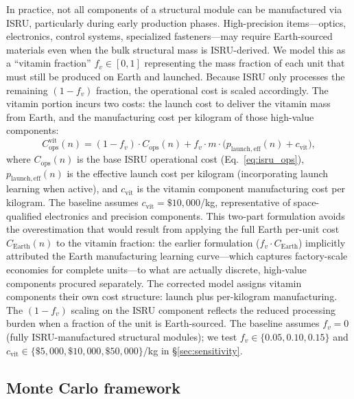 \documentclass[preprint,12pt]{elsarticle}
\begin{document}
In practice, not all components of a structural module can be manufactured via ISRU, particularly during early production phases. High-precision items---optics, electronics, control systems, specialized fasteners---may require Earth-sourced materials even when the bulk structural mass is ISRU-derived. We model this as a ``vitamin fraction'' $f_v \in [0, 1]$ representing the mass fraction of each unit that must still be produced on Earth and launched. Because ISRU only processes the remaining $(1 - f_v)$ fraction, the operational cost is scaled accordingly. The vitamin portion incurs two costs: the launch cost to deliver the vitamin mass from Earth, and the manufacturing cost per kilogram of those high-value components:
\begin{equation}
  C_{\mathrm{ops}}^{\mathrm{vit}}(n) = (1 - f_v) \cdot C_{\mathrm{ops}}(n) + f_v \cdot m \cdot \bigl(p_{\mathrm{launch,eff}}(n) + c_{\mathrm{vit}}\bigr),
  \label{eq:vitamin}
\end{equation}
where $C_{\mathrm{ops}}(n)$ is the base ISRU operational cost (Eq.~\ref{eq:isru_ops}), $p_{\mathrm{launch,eff}}(n)$ is the effective launch cost per kilogram (incorporating launch learning when active), and $c_{\mathrm{vit}}$ is the vitamin component manufacturing cost per kilogram. The baseline assumes $c_{\mathrm{vit}} = \$10{,}000$/kg, representative of space-qualified electronics and precision components. This two-part formulation avoids the overestimation that would result from applying the full Earth per-unit cost $C_{\mathrm{Earth}}(n)$ to the vitamin fraction: the earlier formulation ($f_v \cdot C_{\mathrm{Earth}}$) implicitly attributed the Earth manufacturing learning curve---which captures factory-scale economies for complete units---to what are actually discrete, high-value components procured separately. The corrected model assigns vitamin components their own cost structure: launch plus per-kilogram manufacturing. The $(1 - f_v)$ scaling on the ISRU component reflects the reduced processing burden when a fraction of the unit is Earth-sourced. The baseline assumes $f_v = 0$ (fully ISRU-manufactured structural modules); we test $f_v \in \{0.05, 0.10, 0.15\}$ and $c_{\mathrm{vit}} \in \{\$5{,}000, \$10{,}000, \$50{,}000\}$/kg in \S\ref{sec:sensitivity}.

\subsection{Monte Carlo framework}
\end{document}
